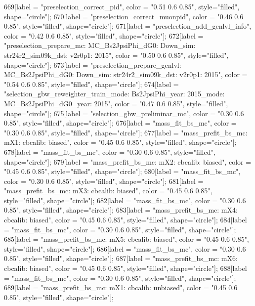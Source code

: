 {	669[label = "preselection_correct_pid", color = "0.51 0.6 0.85", style="filled", shape="circle"];
	670[label = "preselection_correct_muonpid", color = "0.46 0.6 0.85", style="filled", shape="circle"];
	671[label = "preselection_add_genlvl_info", color = "0.42 0.6 0.85", style="filled", shape="circle"];
	672[label = "preselection_prepare_mc\nmode: MC_Bs2JpsiPhi_dG0\npolarity: Down\nstrip_sim: str24r2_sim09k_dst\nversion: v2r0p1\nyear: 2015", color = "0.50 0.6 0.85", style="filled", shape="circle"];
	673[label = "preselection_prepare_genlvl\nmode: MC_Bs2JpsiPhi_dG0\npolarity: Down\nstrip_sim: str24r2_sim09k_dst\nversion: v2r0p1\nyear: 2015", color = "0.54 0.6 0.85", style="filled", shape="circle"];
	674[label = "selection_gbw_reweighter_train\ndata_mode: Bs2JpsiPhi\ndata_year: 2015\nmc_mode: MC_Bs2JpsiPhi_dG0\nmc_year: 2015", color = "0.47 0.6 0.85", style="filled", shape="circle"];
	675[label = "selection_gbw_preliminar_mc", color = "0.30 0.6 0.85", style="filled", shape="circle"];
	676[label = "mass_fit_bs_mc", color = "0.30 0.6 0.85", style="filled", shape="circle"];
	677[label = "mass_prefit_bs_mc\nmassbin: mX1\nmassmodel: cbcalib\ntrigger: biased", color = "0.45 0.6 0.85", style="filled", shape="circle"];
	678[label = "mass_fit_bs_mc", color = "0.30 0.6 0.85", style="filled", shape="circle"];
	679[label = "mass_prefit_bs_mc\nmassbin: mX2\nmassmodel: cbcalib\ntrigger: biased", color = "0.45 0.6 0.85", style="filled", shape="circle"];
	680[label = "mass_fit_bs_mc", color = "0.30 0.6 0.85", style="filled", shape="circle"];
	681[label = "mass_prefit_bs_mc\nmassbin: mX3\nmassmodel: cbcalib\ntrigger: biased", color = "0.45 0.6 0.85", style="filled", shape="circle"];
	682[label = "mass_fit_bs_mc", color = "0.30 0.6 0.85", style="filled", shape="circle"];
	683[label = "mass_prefit_bs_mc\nmassbin: mX4\nmassmodel: cbcalib\ntrigger: biased", color = "0.45 0.6 0.85", style="filled", shape="circle"];
	684[label = "mass_fit_bs_mc", color = "0.30 0.6 0.85", style="filled", shape="circle"];
	685[label = "mass_prefit_bs_mc\nmassbin: mX5\nmassmodel: cbcalib\ntrigger: biased", color = "0.45 0.6 0.85", style="filled", shape="circle"];
	686[label = "mass_fit_bs_mc", color = "0.30 0.6 0.85", style="filled", shape="circle"];
	687[label = "mass_prefit_bs_mc\nmassbin: mX6\nmassmodel: cbcalib\ntrigger: biased", color = "0.45 0.6 0.85", style="filled", shape="circle"];
	688[label = "mass_fit_bs_mc", color = "0.30 0.6 0.85", style="filled", shape="circle"];
	689[label = "mass_prefit_bs_mc\nmassbin: mX1\nmassmodel: cbcalib\ntrigger: unbiased", color = "0.45 0.6 0.85", style="filled", shape="circle"];
}
